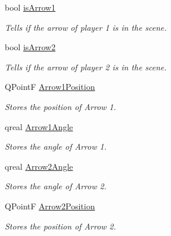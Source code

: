 \begin{DoxyCompactItemize}
\mbox{\label{classgamestate_a4883320071dbaf4e4bb455035b7847a2}} 
bool \hyperlink{classgamestate_a4883320071dbaf4e4bb455035b7847a2}{is\+Arrow1}
\begin{DoxyCompactList}\small\item\em Tells if the arrow of player 1 is in the scene. \end{DoxyCompactList}\item 
\mbox{\label{classgamestate_a216b721f59c27708fbd0bf1e46a11642}} 
bool \hyperlink{classgamestate_a216b721f59c27708fbd0bf1e46a11642}{is\+Arrow2}
\begin{DoxyCompactList}\small\item\em Tells if the arrow of player 2 is in the scene. \end{DoxyCompactList}\item 
\mbox{\label{classgamestate_a25fbcaf81c3ce110b327fe86528de87a}} 
Q\+PointF \hyperlink{classgamestate_a25fbcaf81c3ce110b327fe86528de87a}{Arrow1\+Position}
\begin{DoxyCompactList}\small\item\em Stores the position of Arrow 1. \end{DoxyCompactList}\item 
\mbox{\label{classgamestate_af99cef79dd656dabaa8bf633a5df48a3}} 
qreal \hyperlink{classgamestate_af99cef79dd656dabaa8bf633a5df48a3}{Arrow1\+Angle}
\begin{DoxyCompactList}\small\item\em Stores the angle of Arrow 1. \end{DoxyCompactList}\item 
\mbox{\label{classgamestate_aeceed910e563d8a01b4eb690802f09a3}} 
qreal \hyperlink{classgamestate_aeceed910e563d8a01b4eb690802f09a3}{Arrow2\+Angle}
\begin{DoxyCompactList}\small\item\em Stores the angle of Arrow 2. \end{DoxyCompactList}\item 
\mbox{\label{classgamestate_a7dd00d203a53870b8fb0ddc1958ca5e6}} 
Q\+PointF \hyperlink{classgamestate_a7dd00d203a53870b8fb0ddc1958ca5e6}{Arrow2\+Position}
\begin{DoxyCompactList}\small\item\em Stores the position of Arrow 2. \end{DoxyCompactList}\item 

\end{DoxyCompactItemize}
